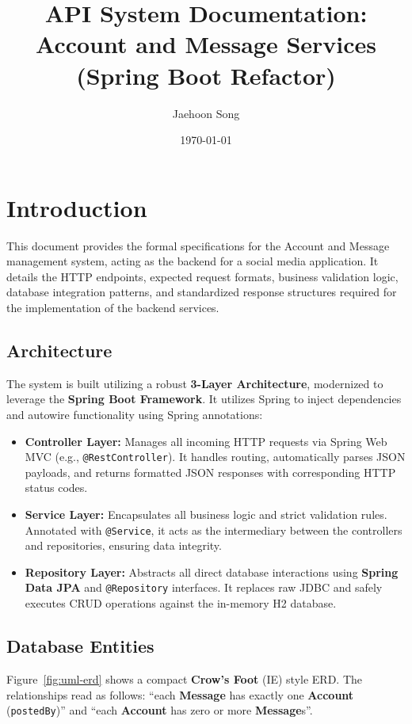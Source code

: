 \documentclass{article}
\title{API System Documentation: Account and Message Services\\(Spring Boot Refactor)}
\author{Jaehoon Song}
\date{\today}
\begin{document}
\maketitle

\section{Introduction}
This document provides the formal specifications for the Account and Message management system, acting as the backend for a social media application. It details the HTTP endpoints, expected request formats, business validation logic, database integration patterns, and standardized response structures required for the implementation of the backend services.

\subsection{Architecture}
The system is built utilizing a robust \textbf{3-Layer Architecture}, modernized to leverage the \textbf{Spring Boot Framework}. It utilizes Spring to inject dependencies and autowire functionality using Spring annotations:
\begin{itemize}
    \item \textbf{Controller Layer:} Manages all incoming HTTP requests via Spring Web MVC (e.g., \texttt{@RestController}). It handles routing, automatically parses JSON payloads, and returns formatted JSON responses with corresponding HTTP status codes.
    \item \textbf{Service Layer:} Encapsulates all business logic and strict validation rules. Annotated with \texttt{@Service}, it acts as the intermediary between the controllers and repositories, ensuring data integrity.
    \item \textbf{Repository Layer:} Abstracts all direct database interactions using \textbf{Spring Data JPA} and \texttt{@Repository} interfaces. It replaces raw JDBC and safely executes CRUD operations against the in-memory H2 database.
\end{itemize}

\subsection{Database Entities}
Figure~\ref{fig:uml-erd} shows a compact \textbf{Crow's Foot} (IE) style ERD. The relationships read as follows:
``each \textbf{Message} has exactly one \textbf{Account} (\texttt{postedBy})'' and
``each \textbf{Account} has zero or more \textbf{Message}s''.
\end{document}
